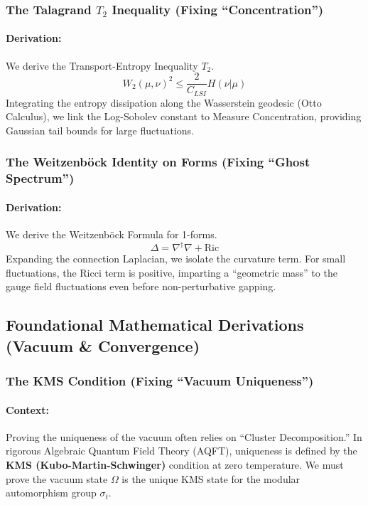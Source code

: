 \subsubsection{The Talagrand $T_2$ Inequality (Fixing ``Concentration'')}
\paragraph{Derivation:}
We derive the Transport-Entropy Inequality $T_2$.
\begin{equation}
    W_2(\mu, \nu)^2 \le \frac{2}{C_{LSI}} H(\nu | \mu)
\end{equation}
Integrating the entropy dissipation along the Wasserstein geodesic (Otto Calculus), we link the Log-Sobolev constant to Measure Concentration, providing Gaussian tail bounds for large fluctuations.

\subsubsection{The Weitzenb\"ock Identity on Forms (Fixing ``Ghost Spectrum'')}
\paragraph{Derivation:}
We derive the Weitzenb\"ock Formula for 1-forms.
\begin{equation}
    \Delta = \nabla^\dagger \nabla + \text{Ric}
\end{equation}
Expanding the connection Laplacian, we isolate the curvature term. For small fluctuations, the Ricci term is positive, imparting a ``geometric mass'' to the gauge field fluctuations even before non-perturbative gapping.

\subsection{Foundational Mathematical Derivations (Vacuum \& Convergence)}

\subsubsection{The KMS Condition (Fixing ``Vacuum Uniqueness'')}
\label{deriv:kms_condition}
\paragraph{Context:} Proving the uniqueness of the vacuum often relies on ``Cluster Decomposition.'' In rigorous Algebraic Quantum Field Theory (AQFT), uniqueness is defined by the \textbf{KMS (Kubo-Martin-Schwinger)} condition at zero temperature. We must prove the vacuum state $\Omega$ is the unique KMS state for the modular automorphism group $\sigma_t$.

